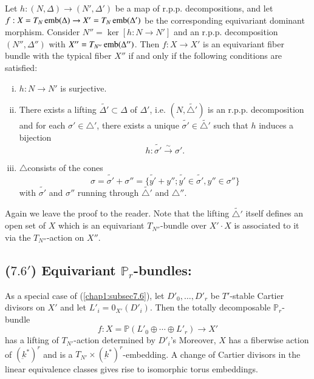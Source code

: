 \begin{prop}\label{chap1:prop7.3} %
Let $h : (N, \Delta) \to (N' , \Delta')$ be a map of
r.p.p. decompositions, and let $f :X = T_{N} \operatorname{emb} (\Delta) \to X' =
T_{N} \operatorname{emb} (\Delta')$ be the corresponding equivariant dominant
morphism. Consider $N'' = \ker [h : N \to N']$ and an
r.p.p. decomposition $(N'' , \Delta'')$ with $X'' = T_{N''} \operatorname{emb}
(\Delta'')$. Then $f : X \to X'$ is an equivariant fiber bundle with
the typical fiber $X''$ if and only if the following conditions are
satisfied: 
\begin{enumerate}[(i)]
\item $h : N \to N'$ is surjective. 

\item There exists a lifting $\tilde{\Delta'} \subset \Delta$ of
  $\Delta'$, i.e. $(N, \tilde{\triangle'})$ is an
  r.p.p. decomposition and for each $\sigma' \in \triangle'$, there
  exists a unique $\tilde{\sigma'} \in \tilde{\triangle'}$ such that
  $h$ induces a bijection  
$$
h : \tilde{\sigma'} \xrightarrow{\sim} \sigma'.  
$$

\item $\triangle$\pageoriginale consists of the cones 
$$
\sigma = \tilde{\sigma'} + \sigma'' = \{\tilde{y'} + y'' ; \tilde{y'}
\in \tilde{\sigma'}, y'' \in \sigma''\} 
$$
with $\tilde{\sigma'}$ and $\sigma''$ running through
$\tilde{\triangle'}$ and $\triangle''$.  
\end{enumerate}
\end{prop}

	Again we leave the proof to the reader. Note that the lifting
        $\tilde{\triangle'}$ itself defines an open set of $X$ which
        is an equivariant $T_{N''}$-bundle over $X' \cdot X$ is associated
        to it via the $T_{N''}$-action on $X''$.  

\subsection*{($7.6'$)  Equivariant
  $\mathbb{P}_{r}$-bundles:}\label{chap1:subsec7.6'} 
As a special case of (\ref{chap1:subsec7.6}), let $D'_{0}, \ldots , D'_{r}$ be
$T'$-stable Cartier divisors on $X'$ and let $L'_{i} = 0_{X'} 
(D'_{i})$. Then the totally decomposable $\mathbb{P}_{r}$- bundle  
$$
f : X = \mathbb{P} (L'_{0} \oplus \cdots \oplus L'_{r}) \to X' 
$$
has a lifting of $T_{N'}$-action determined by $D'_{i}$'s Moreover,
$X$ has a fiberwise action of $(\underbar{k}^{*})^{r}$ and is a
$T_{N'} \times (\underbar{k}^{*})^{r}$-embedding. A change of Cartier
divisors in the linear equivalence classes gives rise to isomorphic
torus embeddings.  

